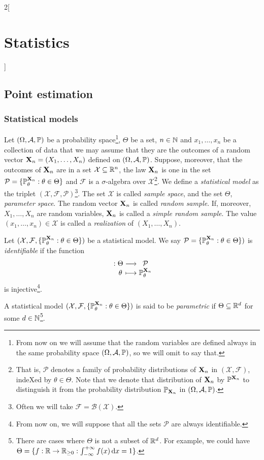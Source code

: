 \documentclass[../../../main.tex]{subfiles}
\begin{document}
\renewcommand{\col}{\sta}
\begin{multicols}{2}[\section{Statistics}]
  \subsection{Point estimation}
  \subsubsection{Statistical models}
  \begin{definition}
    Let $(\Omega,\mathcal{A},\mathbb{P})$ be a probability space\footnote{From now on we will assume that the random variables are defined always in the same probability space $(\Omega,\mathcal{A},\mathbb{P})$, so we will omit to say that.}, $\Theta$ be a set, $n\in\mathbb{N}$ and $x_1,\ldots,x_n$ be a collection of data that we may assume that they are the outcomes of a random vector $\boldsymbol{\mathrm{X}}_n=(X_1,\ldots,X_n)$ defined on $(\Omega,\mathcal{A},\mathbb{P})$. Suppose, moreover, that the outcomes of $\boldsymbol{\mathrm{X}}_n$ are in a set $\mathcal{X}\subseteq\mathbb{R}^n$, the law $\boldsymbol{\mathrm{X}}_n$ is one in the set $\mathcal{P}=\{\mathbb{P}_\theta^{\boldsymbol{\mathrm{X}}_n}:\theta\in\Theta\}$ and $\mathcal{F}$ is a $\sigma$-algebra over $\mathcal{X}$\footnote{That is, $\mathcal{P}$ denotes a family of probability distributions of $\boldsymbol{\mathrm{X}}_n$ in $(\mathcal{X},\mathcal{F})$, indeXed by $\theta\in\Theta$. Note that we denote that distribution of $\boldsymbol{\mathrm{X}}_n$ by $\mathbb{P}^{\boldsymbol{\mathrm{X}}_n}$ to distinguish it from the probability distribution $\mathbb{P}_{\boldsymbol{\mathrm{X}}_n}$ in $(\Omega,\mathcal{A},\mathbb{P})$.}. We define a \emph{statistical model} as the triplet $(\mathcal{X},\mathcal{F},\mathcal{P})$\footnote{Often we will take $\mathcal{F}=\mathcal{B}(\mathcal{X})$.}. The set $\mathcal{X}$ is called \emph{sample space}, and the set $\Theta$, \emph{parameter space}. The random vector $\boldsymbol{\mathrm{X}}_n$ is called \emph{random sample}. If, moreover, $X_1,\ldots,X_n$ are \iid random variables, $\boldsymbol{\mathrm{X}}_n$ is called a \emph{simple random sample}. The value $(x_1,\ldots,x_n)\in\mathcal{X}$ is called a \emph{realization} of $(X_1,\ldots,X_n)$.
  \end{definition}
  \begin{definition}
    Let $(\mathcal{X},\mathcal{F},\{\mathbb{P}_\theta^{\boldsymbol{\mathrm{X}}_n}:\theta\in\Theta\})$ be a statistical model. We say $\mathcal{P}=\{\mathbb{P}_\theta^{\boldsymbol{\mathrm{X}}_n}:\theta\in\Theta\})$ is \emph{identifiable} if the function $$\function{}{\Theta}{\mathcal{P}}{\theta}{\Prob_\theta^{\vf{X}_n}}$$ is injective\footnote{From now on, we will suppose that all the sets $\mathcal{P}$ are always identifiable.}.
  \end{definition}
  \begin{definition}
    A statistical model $(\mathcal{X},\mathcal{F},\{\mathbb{P}_\theta^{\boldsymbol{\mathrm{X}}_n}:\theta\in\Theta\})$ is said to be \emph{parametric} if $\Theta\subseteq \mathbb{R}^d$ for some $d\in\mathbb{N}$\footnote{There are cases where $\Theta$ is not a subset of $\mathbb{R}^d$. For example, we could have $\Theta=\{f:\mathbb{R}\rightarrow\mathbb{R}_{\geq 0} : \int_{-\infty}^{+\infty}f(x)\dd{x}=1\}$.}.
  \end{definition}

\end{multicols}
\end{document}
